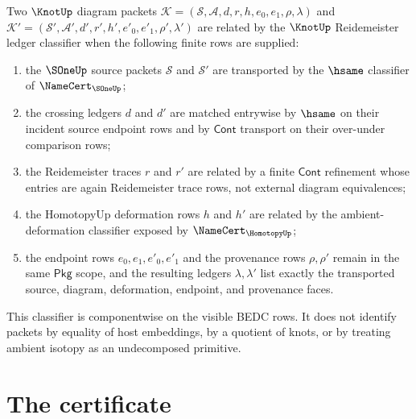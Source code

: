 \begin{definition}
\label{def:knot-reidemeister-ledger-classifier}
Two $\KnotUp$ diagram packets
$\mathcal{K}=(\mathcal{S},\mathcal{A},d,r,h,e_0,e_1,\rho,\lambda)$ and
$\mathcal{K}'=(\mathcal{S}',\mathcal{A}',d',r',h',e'_0,e'_1,\rho',\lambda')$
are related by the $\KnotUp$ Reidemeister ledger classifier when the following
finite rows are supplied:
\begin{enumerate}
  \item the $\SOneUp$ source packets $\mathcal{S}$ and $\mathcal{S}'$ are
  transported by the $\hsame$ classifier of $\NameCert_{\SOneUp}$;
  \item the crossing ledgers $d$ and $d'$ are matched entrywise by $\hsame$
  on their incident source endpoint rows and by $\mathsf{Cont}$ transport on
  their over-under comparison rows;
  \item the Reidemeister traces $r$ and $r'$ are related by a finite
  $\mathsf{Cont}$ refinement whose entries are again Reidemeister trace rows,
  not external diagram equivalences;
  \item the HomotopyUp deformation rows $h$ and $h'$ are related by the
  ambient-deformation classifier exposed by $\NameCert_{\HomotopyUp}$;
  \item the endpoint rows $e_0,e_1,e'_0,e'_1$ and the provenance rows
  $\rho,\rho'$ remain in the same $\mathsf{Pkg}$ scope, and the resulting
  ledgers $\lambda,\lambda'$ list exactly the transported source, diagram,
  deformation, endpoint, and provenance faces.
\end{enumerate}
This classifier is componentwise on the visible BEDC rows. It does not
identify packets by equality of host embeddings, by a quotient of knots, or by
treating ambient isotopy as an undecomposed primitive.
\end{definition}

\section{The certificate}
\label{sec:knot-certificate}

